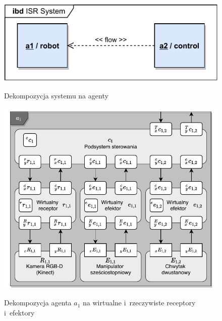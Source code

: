 \begin{figure}
    \centering
    \includegraphics[width=\columnwidth]{figures/ISR-agents.pdf}
    \label{fig:dekompozycja-agent-1}
    \caption{Dekompozycja systemu na agenty}
\end{figure}

\begin{figure}
    \centering
    \includegraphics[width=\columnwidth]{figures/ISR-agent-decomposition.pdf}
    \label{fig:dekompozycja-agent-1}
    \caption{Dekompozycja agenta $a_{1}$ na wirtualne i~rzeczywiste receptory i~efektory}
\end{figure}